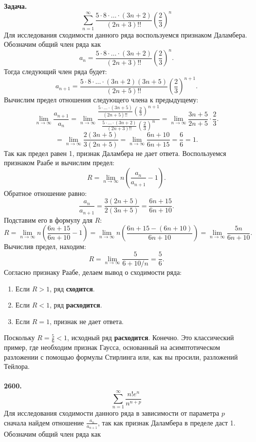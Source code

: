 \documentclass[a4paper, 12pt]{report}
\numberwithin{equation}{section}
\begin{document}
	\\\\
	\textbf{Задача.}
	$$ \sum_{n=1}^{\infty} \frac{5 \cdot 8 \cdot \ldots \cdot (3n+2)}{(2n+3)!!} \left(\frac{2}{3}\right)^n $$
	Для исследования сходимости данного ряда воспользуемся признаком Даламбера. Обозначим общий член ряда как
	$$ a_n = \frac{5 \cdot 8 \cdot \ldots \cdot (3n+2)}{(2n+3)!!} \left(\frac{2}{3}\right)^n. $$
	Тогда следующий член ряда будет:
	$$ a_{n+1} = \frac{5 \cdot 8 \cdot \ldots \cdot (3n+2)(3n+5)}{(2n+5)!!} \left(\frac{2}{3}\right)^{n+1}. $$
	Вычислим предел отношения следующего члена к предыдущему:
	$$ \lim_{n \to \infty} \frac{a_{n+1}}{a_n} = \lim_{n \to \infty} \frac{\frac{5 \cdot \ldots \cdot (3n+5)}{(2n+5)!!} (\frac{2}{3})^{n+1}}{\frac{5 \cdot \ldots \cdot (3n+2)}{(2n+3)!!} (\frac{2}{3})^n} = \lim_{n \to \infty} \frac{3n+5}{2n+5} \cdot \frac{2}{3}. $$
	$$ = \lim_{n \to \infty} \frac{2(3n+5)}{3(2n+5)} = \lim_{n \to \infty} \frac{6n+10}{6n+15} = \frac{6}{6} = 1. $$
	Так как предел равен 1, признак Даламбера не дает ответа. Воспользуемся признаком Раабе и вычислим предел:
	$$ R = \lim_{n \to \infty} n \left( \frac{a_n}{a_{n+1}} - 1 \right). $$
	Обратное отношение равно:
	$$ \frac{a_n}{a_{n+1}} = \frac{3(2n+5)}{2(3n+5)} = \frac{6n+15}{6n+10}. $$
	Подставим его в формулу для $R$:
	$$ R = \lim_{n \to \infty} n \left( \frac{6n+15}{6n+10} - 1 \right) = \lim_{n \to \infty} n \left( \frac{6n+15 - (6n+10)}{6n+10} \right) = \lim_{n \to \infty} \frac{5n}{6n+10}. $$
	Вычислив предел, находим:
	$$ R = \lim_{n \to \infty} \frac{5}{6+10/n} = \frac{5}{6}. $$
	Согласно признаку Раабе, делаем вывод о сходимости ряда:
	\begin{enumerate}
		\item Если $R > 1$, ряд \textbf{сходится}.
		\item Если $R < 1$, ряд \textbf{расходится}.
		\item Если $R = 1$, признак не дает ответа.
	\end{enumerate}
	Поскольку $R = \frac{5}{6} < 1$, исходный ряд \textbf{расходится}.
	Конечно. Это классический пример, где необходим признак Гаусса, основанный на асимптотическом разложении с помощью формулы Стирлинга или, как вы просили, разложений Тейлора.
	\\\\
	\textbf{2600.}
	$$ \sum_{n=1}^{\infty} \frac{n! e^n}{n^{n+p}} $$
	Для исследования сходимости данного ряда в зависимости от параметра $p$ сначала найдем отношение $\frac{a_n}{a_{n+1}}$, так как признак Даламбера в пределе даст 1. Обозначим общий член ряда как
\end{document}
